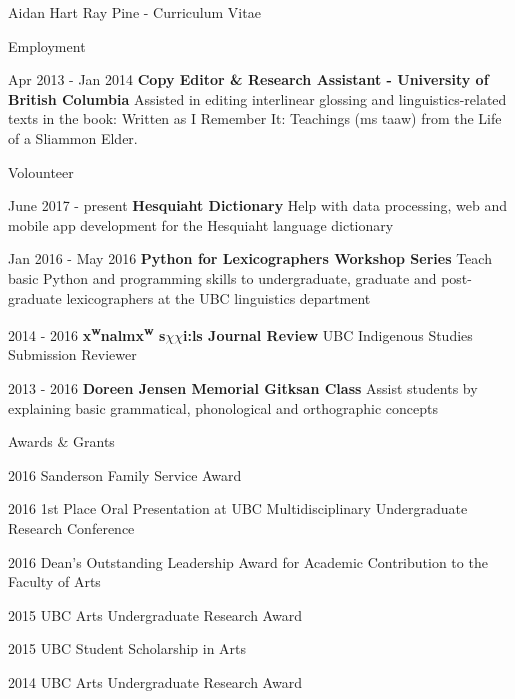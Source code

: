 \documentclass[12pt]{letter}
\begin{document}
\begin{cv}{ Aidan Hart Ray Pine  \space - \space   Curriculum Vitae}
\begin{cvlist}{Employment}
                            \item[Apr 2013 -  Jan 2014 ] \textbf{Copy Editor \& Research Assistant - University of British Columbia}
                \newline Assisted in editing interlinear glossing and linguistics-related texts in the book: Written as I Remember It: Teachings ({\textglotstop}{\textschwa}ms ta{\textglotstop}aw) from the Life of a Sliammon Elder.
                    \end{cvlist}
        
        \begin{cvlist}{Volounteer}
                            \item[June 2017 - present] \textbf{Hesquiaht Dictionary}
                \newline Help with data processing, web and mobile app development for the Hesquiaht language dictionary
                            \item[Jan 2016 - May 2016] \textbf{Python for Lexicographers Workshop Series}
                \newline Teach basic Python and programming skills to undergraduate, graduate and post-graduate lexicographers at the UBC linguistics department
                            \item[2014 - 2016] \textbf{x{\textsuperscript{w}}na{\textglotstop}{\textschwa}l{\textschwa}mx{\textsuperscript{w}} s{\ensuremath{\chi}}{\textschwa}{\ensuremath{\chi}}i:ls Journal Review}
                \newline UBC Indigenous Studies Submission Reviewer
                            \item[2013 - 2016] \textbf{Doreen Jensen Memorial Gitksan Class}
                \newline Assist students by explaining basic grammatical, phonological and orthographic concepts
                    \end{cvlist}

        \begin{cvlist}{Awards \& Grants}
                        \item[2016] Sanderson Family Service Award
                        \item[2016] 1st Place Oral Presentation at UBC Multidisciplinary Undergraduate Research Conference
                        \item[2016] Dean's Outstanding Leadership Award for Academic Contribution to the Faculty of Arts
                        \item[2015] UBC Arts Undergraduate Research Award
                        \item[2015] UBC Student Scholarship in Arts
                        \item[2014] UBC Arts Undergraduate Research Award
                    \end{cvlist}

    \end{cv}
    
    
\end{document}
